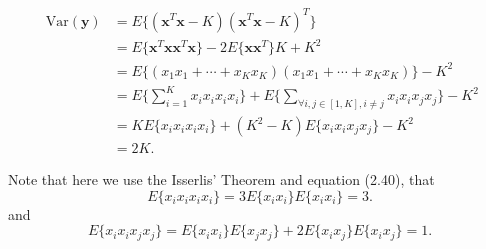 \documentclass[a4paper, 11pt]{article}
\begin{document}
\begin{equation*}
\begin{split}
\text{ Var}(\mathbf{y}) &= E\{(\mathbf{x}^T\mathbf{x}-K)(\mathbf{x}^T\mathbf{x}-K)^T\} \\
& = E\{\mathbf{x}^T\mathbf{x}\mathbf{x}^T\mathbf{x}\}-2E\{\mathbf{x}\mathbf{x}^T\}K+ K^2\\
& =  E\{(x_1x_1+\cdots+x_Kx_K)(x_1x_1+\cdots+x_Kx_K)\} -K^2 \\
& = E\{\sum_{i=1}^K x_ix_ix_ix_i\}+ E\{\sum_{\forall i,j\in[1,K], i\neq j} x_ix_ix_jx_j\}-K^2\\
& = K E\{x_ix_ix_ix_i\} + (K^2-K) E\{x_ix_ix_jx_j\} - K^2 \\
& = 2K.
\end{split}
\end{equation*}


Note that here we use the Isserlis' Theorem and equation (2.40), that  
\begin{equation*}
    E\{x_ix_ix_ix_i\} = 3E\{x_ix_i\}E\{x_ix_i\} = 3.
\end{equation*} and 
\begin{equation*}
    E\{x_ix_ix_jx_j\} =E\{x_ix_i\}E\{x_jx_j\}+2E\{x_ix_j\}E\{x_ix_j\}=1.
\end{equation*}




\newpage


\end{document}
